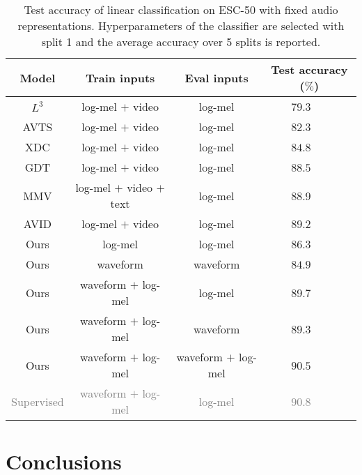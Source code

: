 \documentclass{article}
\newcommand\spv[1]{\textcolor{grey}{#1}}
\begin{document}
\begin{table}[t]
  \caption{Test accuracy of linear classification on ESC-50 with fixed audio representations. Hyperparameters of the classifier are selected with split 1 and the average accuracy over 5 splits is reported.}
  \label{tab:esc50_benckmark}
  \centering
  \begin{tabular}{ c c c c }
    \toprule
    \textbf{Model} & \textbf{Train inputs} & \textbf{Eval inputs} & \textbf{Test accuracy ($\%$)} \\
    \midrule
    $L^3$ \cite{arandjelovic2017look} & log-mel $+$ video & log-mel & $79.3$~~~\\
    AVTS \cite{korbar2018cooperative} & log-mel $+$ video & log-mel  & $82.3$~~~\\
    XDC \cite{alwassel2019self} & log-mel $+$ video & log-mel & $84.8$~~~\\
    GDT \cite{mandela2020datatrans} & log-mel $+$ video & log-mel & $88.5$~~~\\
    MMV \cite{alayrac2020self} & log-mel $+$ video $+$ text & log-mel  & $88.9$~~~\\
    AVID \cite{morgado20avid}  & log-mel $+$ video & log-mel & $89.2$~~~\\
    \midrule
    Ours                  & log-mel     & log-mel     & $86.3$~~~\\
    Ours                  & waveform    & waveform      & $84.9$~~~\\
    Ours                  & waveform $+$ log-mel & log-mel & $89.7$~~~\\
    Ours                  & waveform $+$ log-mel & waveform & $89.3$~~~\\
    Ours                  & waveform $+$ log-mel & waveform $+$ log-mel & $\mathbf{90.5}$~~~\\
    \midrule
    \spv{Supervised \cite{kong2020panns}}  &  \spv{waveform $+$ log-mel} & \spv{log-mel}  & \spv{$90.8$}~~~\\
    \bottomrule
  \end{tabular}
  
\end{table}



\section{Conclusions}
\end{document}

